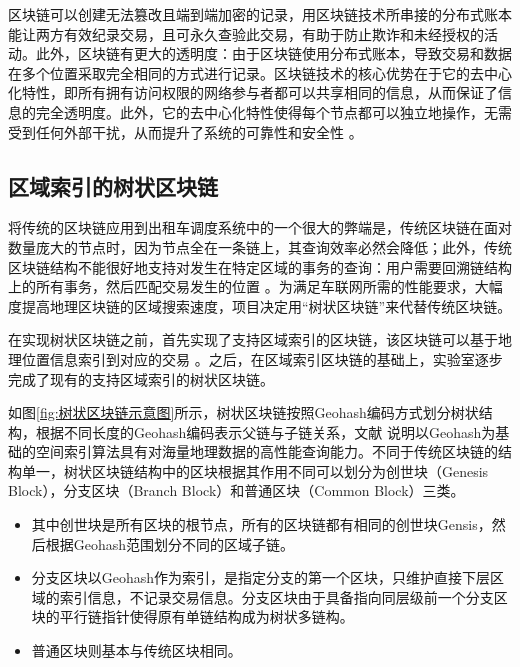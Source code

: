区块链可以创建无法篡改且端到端加密的记录，用区块链技术所串接的分布式账本能让两方有效纪录交易，且可永久查验此交易，有助于防止欺诈和未经授权的活动。此外，区块链有更大的透明度：由于区块链使用分布式账本，导致交易和数据在多个位置采取完全相同的方式进行记录。区块链技术的核心优势在于它的去中心化特性，即所有拥有访问权限的网络参与者都可以共享相同的信息，从而保证了信息的完全透明度。此外，它的去中心化特性使得每个节点都可以独立地操作，无需受到任何外部干扰，从而提升了系统的可靠性和安全性 。


\subsection{区域索引的树状区块链}

将传统的区块链应用到出租车调度系统中的一个很大的弊端是，传统区块链在面对数量庞大的节点时，因为节点全在一条链上，其查询效率必然会降低；此外，传统区块链结构不能很好地支持对发生在特定区域的事务的查询：用户需要回溯链结构上的所有事务，然后匹配交易发生的位置  。为满足车联网所需的性能要求，大幅度提高地理区块链的区域搜索速度，项目决定用“树状区块链”来代替传统区块链。

在实现树状区块链之前，首先实现了支持区域索引的区块链，该区块链可以基于地理位置信息索引到对应的交易 。之后，在区域索引区块链的基础上，实验室逐步完成了现有的支持区域索引的树状区块链。

如图\ref{fig:树状区块链示意图}所示，树状区块链按照Geohash编码方式划分树状结构，根据不同长度的Geohash编码表示父链与子链关系，文献 说明以Geohash为基础的空间索引算法具有对海量地理数据的高性能查询能力。不同于传统区块链的结构单一，树状区块链结构中的区块根据其作用不同可以划分为创世块（Genesis Block），分支区块（Branch Block）和普通区块（Common Block）三类。

\begin{itemize}
    \item 其中创世块是所有区块的根节点，所有的区块链都有相同的创世块Gensis，然后根据Geohash范围划分不同的区域子链。
    \item 分支区块以Geohash作为索引，是指定分支的第一个区块，只维护直接下层区域的索引信息，不记录交易信息。分支区块由于具备指向同层级前一个分支区块的平行链指针使得原有单链结构成为树状多链构。
    \item 普通区块则基本与传统区块相同。
\end{itemize}

